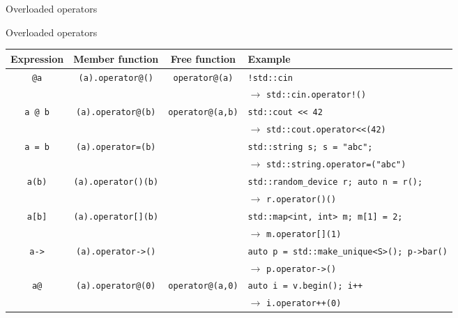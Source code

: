 \begin{frame}{Overloaded operators}{}
  \begin{block}{Overloaded operators}
    \begin{center}
      \scriptsize
      \begin{tabular}{|c|c|c|l|}
        \hline
        Expression & Member function & Free function & Example \\
        \hline
        \lstinline!@a! & \lstinline!(a).operator@()! & \lstinline!operator@(a)! & \lstinline+!std::cin+ \\
                      &                             &                          & $\to$ \lstinline+std::cin.operator!()+ \\
        \hline
        \lstinline!a @ b! & \lstinline!(a).operator@(b)! & \lstinline!operator@(a,b)! & \lstinline!std::cout << 42! \\
                          &                              &                            & $\to$ \lstinline!std::cout.operator<<(42)! \\
        \hline
        \lstinline!a = b! & \lstinline!(a).operator=(b)! &                            & \lstinline!std::string s; s = "abc";! \\
                          &                              &                            & $\to$ \lstinline!std::string.operator=("abc")! \\
        \hline
        \lstinline!a(b)! & \lstinline!(a).operator()(b)! &                            & \lstinline!std::random_device r; auto n = r();! \\
                        &                               &                            & $\to$ \lstinline!r.operator()()! \\
        \hline
        \lstinline!a[b]! & \lstinline!(a).operator[](b)! &                            & \lstinline!std::map<int, int> m; m[1] = 2;! \\
                        &                               &                            & $\to$ \lstinline!m.operator[](1)! \\
        \hline
        \lstinline!a->!  & \lstinline!(a).operator->()!  &                            & \lstinline!auto p = std::make_unique<S>(); p->bar()! \\
                        &                               &                            & $\to$ \lstinline!p.operator->()! \\
        \hline
        \lstinline!a@!   & \lstinline!(a).operator@(0)!  & \lstinline!operator@(a,0)! & \lstinline!auto i = v.begin(); i++! \\
                        &                               &                            & $\to$ \lstinline!i.operator++(0)! \\
        \hline
      \end{tabular}
    \end{center}
  \end{block}
\end{frame}


